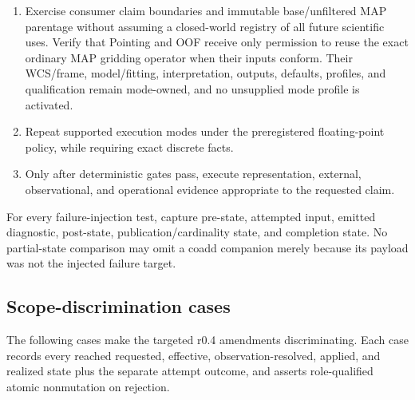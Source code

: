 \documentclass[10pt]{article}
\begin{document}
\begin{enumerate}
does not block it. For a response-bearing coadd, require one exact shared family
\(R\), compatible source/perturbation/basis/unit/normalization/gauge/WCS/row
identities, fixed membership/placement/\(B_{\rm out}\)/support/coefficients, and
an exact composition theorem; reject multiplication of a finite difference
through \(B_{\rm out}\) as a Jacobian without that theorem. For coadd covariance, require
every block named by the selected covariance-qualified role before accepting the complete numerical propagation and
otherwise require partial, symbolic, summarized, lineage-resolvable, or
unavailable state on the base role. Verify no stronger role subsets an existing
base parent and verify versioned binding for later derivative products.
\item Exercise consumer claim boundaries and immutable base/unfiltered MAP
parentage without assuming a closed-world registry of all future scientific
uses.  Verify that Pointing and OOF receive only permission to reuse the exact
ordinary MAP gridding operator when their inputs conform.  Their WCS/frame,
model/fitting, interpretation, outputs, defaults, profiles, and qualification
remain mode-owned, and no unsupplied mode profile is activated.
\item Repeat supported execution modes under the preregistered floating-point
policy, while requiring exact discrete facts.
\item Only after deterministic gates pass, execute representation, external,
observational, and operational evidence appropriate to the requested claim.
\end{enumerate}

For every failure-injection test, capture pre-state, attempted input, emitted
diagnostic, post-state, publication/cardinality state, and completion state.
No partial-state comparison may omit a coadd companion merely because its
payload was not the injected failure target.

\subsection{Scope-discrimination cases}

The following cases make the targeted r0.4 amendments discriminating. Each
case records every reached requested, effective, observation-resolved, applied,
and realized state plus the separate attempt outcome, and asserts
role-qualified atomic nonmutation on rejection.

\SCIMapProductRoleDefinition
\end{document}
